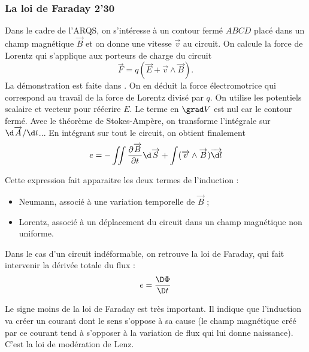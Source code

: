 \subsubsection{La loi de Faraday 2'30}

Dans le cadre de l'ARQS, on s'intéresse à un contour fermé $ABCD$ placé dans un champ magnétique $\overrightarrow{B}$ et on donne une vitesse $\overrightarrow{v}$ au circuit.
On calcule la force de Lorentz qui s'applique aux porteurs de charge du circuit
\begin{equation}
\overrightarrow{F} = q(\overrightarrow{E} + \overrightarrow{v}\wedge\overrightarrow{B}).
\end{equation}
La démonstration est faite dans \cite{Perez2009}.
On en déduit la force électromotrice qui correspond au travail de la force de Lorentz divisé par $q$.
On utilise les potentiels scalaire et vecteur pour réécrire $E$.
Le terme en $\grad V$ est nul car le contour fermé.
Avec le théorème de Stokes-Ampère, on transforme l'intégrale sur $\d\overrightarrow{A}/\d t$...
En intégrant sur tout le circuit, on obtient finalement
\begin{equation}
e=-\iint \frac{\partial\overrightarrow{B}}{\partial t}\d \overrightarrow{S} + \int (\overrightarrow{v}\wedge\overrightarrow{B})\overrightarrow{\d l}
\end{equation}

Cette expression fait apparaitre les deux termes de l'induction :
\begin{itemize}
\item Neumann, associé à une variation temporelle de $\overrightarrow{B}$ ;
\item Lorentz, associé à un déplacement du circuit dans un champ magnétique non uniforme.
\end{itemize}

Dans le cas d'un circuit indéformable, on retrouve la loi de Faraday, qui fait intervenir la dérivée totale du flux :
\begin{equation}
e = \frac{\D \Phi}{\D t}
\end{equation}

\begin{transition}
Le signe moins de la loi de Faraday est très important.
Il indique que l'induction va créer un courant dont le sens s'oppose à sa cause (le champ magnétique créé par ce courant tend à s'opposer à la variation de flux qui lui donne naissance).
C'est la loi de modération de Lenz.
\end{transition}

